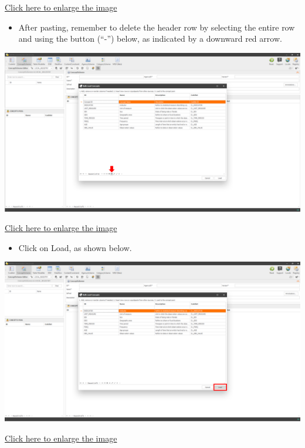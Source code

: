 \documentclass[
]{book}
\providecommand{\tightlist}{%
  \setlength{\itemsep}{0pt}\setlength{\parskip}{0pt}}
\begin{document}
\href{images/image106.png}{Click here to enlarge the image}

\begin{itemize}
\tightlist
\item
  After pasting, remember to delete the header row by selecting the entire row and using the button (``-'') below, as indicated by a downward red arrow.
\end{itemize}

\begin{center}\includegraphics[width=1\linewidth]{./images/image108} \end{center}

\href{images/image108.png}{Click here to enlarge the image}

\begin{itemize}
\tightlist
\item
  Click on Load, as shown below.
\end{itemize}

\begin{center}\includegraphics[width=1\linewidth]{./images/image110} \end{center}

\href{images/image110.png}{Click here to enlarge the image}
\end{document}
